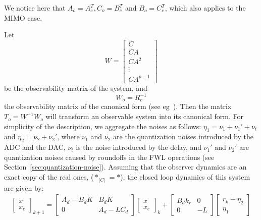 \documentclass[sigconf]{llncs}
\newcommand{\mat}[1]{{#1}}
\renewcommand{\vec}[1]{{#1}}
\begin{document}
We notice here that $\mat{A}_o=\mat{A}_c^T, \mat{C}_o=\mat{B}_c^T$
and $\mat{B}_o=\mat{C}_c^T$, which also applies to the MIMO case.

Let 
\begin{equation}
\label{eq:wnof}
\mat{W}=\left[\begin{array}{c}\mat{C}\\ \mat{C}\mat{A}\\ \mat{C}\mat{A}^2\\ \vdots\\ \mat{C}\mat{A}^{p-1}\end{array}\right]
\end{equation}
be the observability matrix of the system, and
\begin{equation}
\label{eq:wof}
\mat{W}_{o}=\mat{R}_{c}^{-1}
\end{equation}
the observability matrix of the canonical form (see eg~\cite{Astrom08}). Then the matrix $\mat{T}_o=\mat{W}^{-1}\mat{W}_{o}$ will transform an observable system into its canonical form.
For simplicity of the description, we aggregate the noises as follows:
$\eta_1=\nu_1+\nu_1'+\nu_t$ and $\eta_2=\nu_2+\nu_2'$,
where $\nu_1$ and $\nu_2$ are the quantization noises introduced by the ADC and the DAC, $\nu_t$ is the noise introduced by the delay, and $\nu_1'$ and $\nu_2'$ are quantization noises caused by roundoffs in the FWL operations (see Section~\ref{sec:quantization-noise}).
Assuming that the observer dynamics are an exact copy of the real ones, ($\mat{*}_{\langle C \rangle}=\mat{*}$), the closed loop dynamics of this system are given by:
\begin{align}
\left [\begin{array}{c}\vec{x}\\ \vec{x}_e \end{array}\right]_{k+1}
=\left [\begin{array}{cc}\mat{A}_d-\mat{B}_d\mat{K}&\mat{B}_d\mat{K}\\ \mat{0}&\mat{A}_d-\mat{L}\mat{C}_d\end{array}\right]
\left [\begin{array}{c}\vec{x}\\ \vec{x}_e \end{array}\right]_k
+\left [\begin{array}{cc}\mat{B}_dk_r&\mat{0}\\ \mat{0}&-\mat{L}\end{array}\right]\left [\begin{array}{c}\vec{r}_k+\vec{\eta}_2\\ \vec{\eta}_1\end{array}\right]
\label{eq:observer_LTI}
\end{align}
\end{document}
